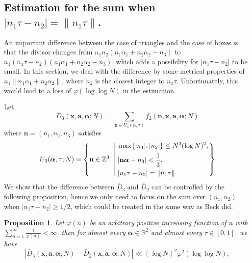 \documentclass[11pt]{article}
\newtheorem{Prop}{Proposition}[section]
\newcommand{\beq}{\begin{equation}}
\newcommand{\eeq}{\end{equation}}
\newcommand{\fc}{\frac}
\renewcommand{\l}{\left}
\renewcommand{\r}{\right}
\newcommand{\Z}{\mathbb{Z}}
\newcommand{\R}{\mathbb{R}}
\renewcommand{\a}{\alpha}
\renewcommand{\(}{\left(}
\renewcommand{\)}{\right)}
\renewcommand{\bf}{\mathbf}
\newcommand{\bal}{\begin{aligned}}
\newcommand{\eal}{\end{aligned}}
\newcommand{\n}{\bf{n}}
\newcommand{\bma}{\bm{\alpha}}
\newcommand{\ftwo}{f_2(\bf{n},\bf{x},\bm{a},\bm{\a};N)}
\newcommand{\<}{\langle}
\renewcommand{\>}{\rangle}
\begin{document}
\subsection{Estimation for the sum when $|n_1 \tau-n_2|=\|n_1\tau\|$.}
An important difference between the case of triangles and the case of boxes is that the divisor changes from $n_1 n_2(n_1\a_1 +n_2\a_2 -n_3)$ to $n_1(n_1\tau-n_2)(n_1\a_1+n_2\a_2-n_3)$, which adds a possibility for $|n_1\tau-n_2|$ to be small. In this section, we deal with the difference by some metrical properties of  $n_1\|n_1\a_1+n_2\a_2\|$, where $n_2$ is the closest integer to $n_1\tau$. Unfortunately, this would lead to a loss of $\varphi(\log \log N)$ in the estimation.

Let 
$$
\bar{D}_3(\bf{x},\bm{a},\bm{\a};N)=\sum_{\bf{n}\in U_3(\alpha,\tau)}  \ftwo
$$
where $\bf{n}=(n_1,n_2,n_3)$ satisfies
\beq{\label{n1*tau-n2 bigger than one third}}
U_3(\bma,\tau;N)=
\l\{\n\in\Z^3 \ \l| \ 
\bal 
&\max\{|n_1|,|n_2|\}\le N^2(\log N)^2,\\
&|\n \bma -n_3|< \fc{1}{3}, \\
&|n_1\tau-n_2|=\|n_1\tau\|\\
\eal
\r.\r\}
\eeq
We show that the difference between $\bar{D}_3$ and $\bar{D}_2$ can be controlled by the following proposition, hence we only need to focus on the sum over $(n_1, n_2)$ when $|n_1\tau-n_2|\ge 1/2$, which could be treated in the same way as Beck did.
\begin{Prop}
Let $\varphi(n)$ be an arbitrary positive increasing function of $n$ with $\sum_{n=1}^{\infty}\fc{1}{\varphi(n)}<\infty$, then for almost every $\bma \in \R^2$ and almost every $\tau\in [0,1]$, we have
$$
\l|\bar{D}_3(\bf{x},\bm{a},\bm{\a};N)-\bar{D}_2(\bf{x},\bm{a},\bm{\a};N)\r| \ll (\log N)^2\varphi^2(\log \log N),
$$
\end{Prop}
\end{document}
